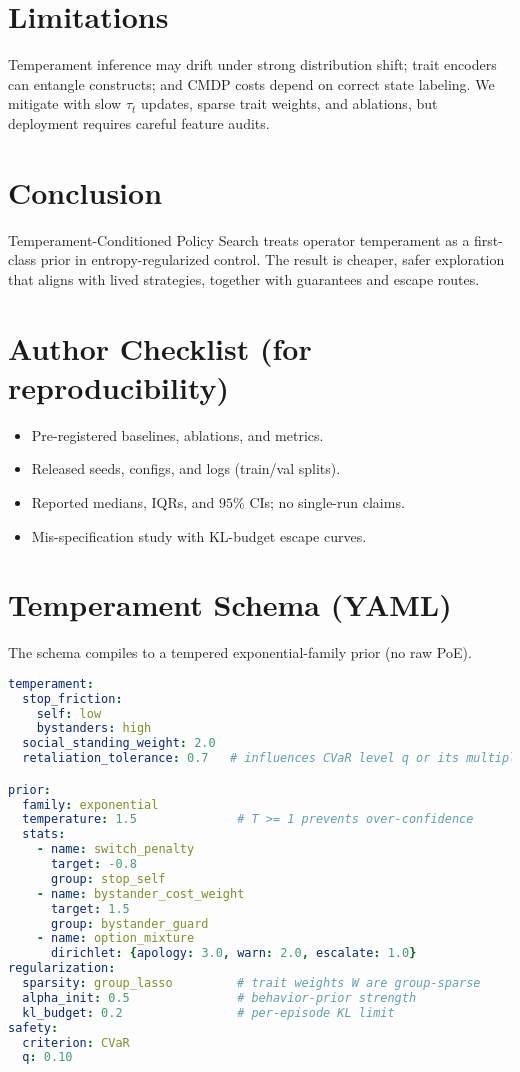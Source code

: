 \documentclass[10pt]{article}
\theoremstyle{plain}
\theoremstyle{definition}
\theoremstyle{remark}
\newcommand{\1}{\mathds{1}}
\begin{document}
\section{Limitations}
Temperament inference may drift under strong distribution shift; trait encoders can entangle constructs; and CMDP costs depend on correct state labeling. We mitigate with slow $\tau_t$ updates, sparse trait weights, and ablations, but deployment requires careful feature audits.

\section{Conclusion}
Temperament-Conditioned Policy Search treats operator temperament as a first-class prior in entropy-regularized control. The result is cheaper, safer exploration that aligns with lived strategies, together with guarantees and escape routes.

\section*{Author Checklist (for reproducibility)}
\begin{itemize}[leftmargin=1.5em]
\item Pre-registered baselines, ablations, and metrics.
\item Released seeds, configs, and logs (train/val splits).
\item Reported medians, IQRs, and $95\%$ CIs; no single-run claims.
\item Mis-specification study with KL-budget escape curves.
\end{itemize}

\appendix

\section{Temperament Schema (YAML)}
\label{app:yaml}
\noindent The schema compiles to a tempered exponential-family prior (no raw PoE).
\begin{lstlisting}[language=YAML]
temperament:
  stop_friction:
    self: low
    bystanders: high
  social_standing_weight: 2.0
  retaliation_tolerance: 0.7   # influences CVaR level q or its multiplier

prior:
  family: exponential
  temperature: 1.5              # T >= 1 prevents over-confidence
  stats:
    - name: switch_penalty
      target: -0.8
      group: stop_self
    - name: bystander_cost_weight
      target: 1.5
      group: bystander_guard
    - name: option_mixture
      dirichlet: {apology: 3.0, warn: 2.0, escalate: 1.0}
regularization:
  sparsity: group_lasso         # trait weights W are group-sparse
  alpha_init: 0.5               # behavior-prior strength
  kl_budget: 0.2                # per-episode KL limit
safety:
  criterion: CVaR
  q: 0.10
\end{lstlisting}
\end{document}
